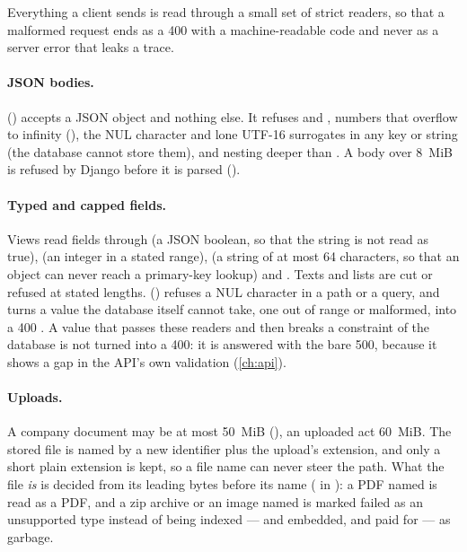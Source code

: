 Everything a client sends is read through a small set of strict readers, so that a malformed
request ends as a 400 with a machine-readable code and never as a server error that leaks a
trace.

\paragraph{JSON bodies.}  () accepts a JSON object
and nothing else. It refuses  and , numbers that overflow to infinity
(), the NUL character and lone UTF-16 surrogates in any key or string (the
database cannot store them), and nesting deeper than  \code{=} . A body over
8~MiB is refused by Django before it is parsed ().

\paragraph{Typed and capped fields.} Views read fields through  (a JSON
boolean, so that the string  is not read as true), 
(an integer in a stated range),  (a string of at most 64 characters, so that an
object can never reach a primary-key lookup) and . Texts and lists are cut or
refused at stated lengths.  () refuses
a NUL character in a path or a query, and turns a value the database itself cannot take, one
out of range or malformed, into a
400 . A value that passes these readers and then breaks a constraint of
the database is not turned into a 400: it is answered with the bare 500, because it shows a
gap in the API's own validation (\cref{ch:api}).

\paragraph{Uploads.} A company document may be at most 50~MiB (), an
uploaded act 60~MiB. The stored file is named by a new identifier plus the upload's
extension, and only a short plain extension is kept, so a file name can never steer the
path. What the file \emph{is} is decided from its leading bytes before its name
( in ): a PDF named  is read as a
PDF, and a zip archive or an image named  is marked failed as an unsupported
type instead of being indexed --- and embedded, and paid for --- as garbage.

